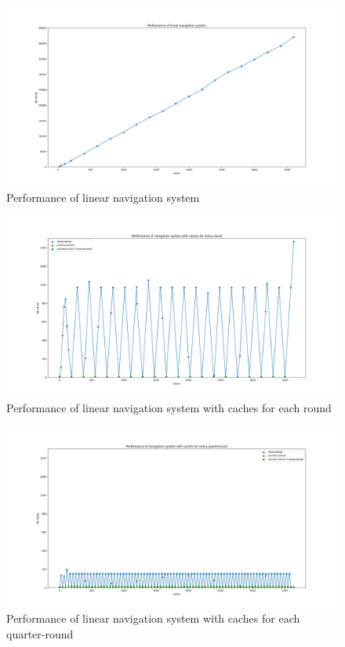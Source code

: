 \begin{figure}
\centering
\includegraphics[width=\textwidth]{figures/pyplot/performance_navsystem-linear.png}
\caption{Performance of linear navigation system}
\label{fig:navsystem.performance.linear}
\end{figure}

\begin{figure}
\centering
\includegraphics[width=\textwidth]{figures/pyplot/performance_navsystem-round-cache.png}
\caption{Performance of linear navigation system with caches for each round}
\label{fig:navsystem.performance.round}
\end{figure}

\begin{figure}
\centering
\includegraphics[width=\textwidth]{figures/pyplot/performance_navsystem-qr-cache.png}
\caption{Performance of linear navigation system with caches for each quarter-round}
\label{fig:navsystem.performance.qr}
\end{figure}


